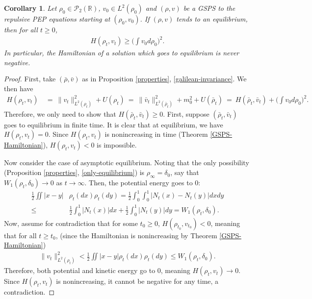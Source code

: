 \documentclass[11pt]{article}
\newtheorem{corollary}[theorem]{Corollary}
\numberwithin{equation}{section}
\begin{document}
        \begin{corollary}
            Let $\rho_0\in\mathcal{P}_2(\mathbb{R})$, $v_0\in L^2(\rho_0)$ and $(\rho,v)$ be a GSPS to the repulsive PEP equations starting at $(\rho_0,v_0)$. If $(\rho,v)$ tends to an equilibrium, then for all $t\geq0$, 
            \begin{align*}
                H(\rho_t,v_t)\geq\Big(\int v_0d\rho_0\Big)^2.
            \end{align*}
            In particular, the Hamiltonian of a solution which goes to equilibrium is never negative. 
        \end{corollary}
        \begin{proof}
            First, take $(\bar{\rho},\bar{v})$ as in Proposition \ref{properties}, \ref{galilean-invariance}. We then have 
            \begin{align*}
                H(\rho_t,v_t)&\ =\ \|v_t\|_{L^2(\rho_t)}^2+U(\rho_t)\ =\ \|\bar{v}_t\|_{L^2(\bar{\rho}_t)}^2+m_0^2+U(\bar{\rho}_t)
                \ =\ H(\bar{\rho}_t,\bar{v}_t)+\Big(\int v_0d\rho_0\Big)^2.
            \end{align*}
            Therefore, we only need to show that $H(\bar{\rho}_t,\bar{v}_t)\geq0$. First, suppose $(\bar{\rho}_t,\bar{v}_t)$ goes to equilibrium in finite time. It is clear that at equilibrium, we have $H(\rho_t,v_t)=0$. Since $H(\rho_t,v_t)$ is nonincreasing in time (Theorem \ref{GSPS-Hamiltonian}), $H(\rho_t,v_t)<0$ is impossible. 

            Now consider the case of asymptotic equilibrium. Noting that the only possibility (Proposition \ref{properties}, \ref{only-equilibrium}) is $\rho_\infty=\delta_0$, say that $W_1(\rho_t,\delta_0)\to0$ as $t\to\infty$. Then, the potential energy goes to 0: 
            \begin{align*}
                \frac{1}{2}\iint|x-y|&\rho_t(dx)\rho_t(dy)=\frac{1}{2}\int_0^1 \!\! \int_0^1|N_t(x)-N_t(y)|dxdy
                \\
                \leq&\frac{1}{2}\int_0^1|N_t(x)|dx+\frac{1}{2}\int_0^1|N_t(y)|dy= W_1(\rho_t,\delta_0).
            \end{align*}
            Now, assume for contradiction that for some $t_0\geq0$, $H(\rho_{t_0},v_{t_0})<0$, meaning that for all $t\geq t_0$, (since the Hamiltonian is nonincreasing by Theorem \ref{GSPS-Hamiltonian})
            \begin{align*}
                \|v_t\|_{L^2(\rho_t)}^2<\frac{1}{2}\iint|x-y|\rho_t(dx)\rho_t(dy)\leq W_1(\rho_t,\delta_0).
            \end{align*}
            Therefore, both potential and kinetic energy go to $0$, meaning $H(\rho_t,v_t)\to0$. Since $H(\rho_t,v_t)$ is nonincreasing, it cannot be negative for any time, a contradiction.         
        \end{proof}
                
\end{document}
